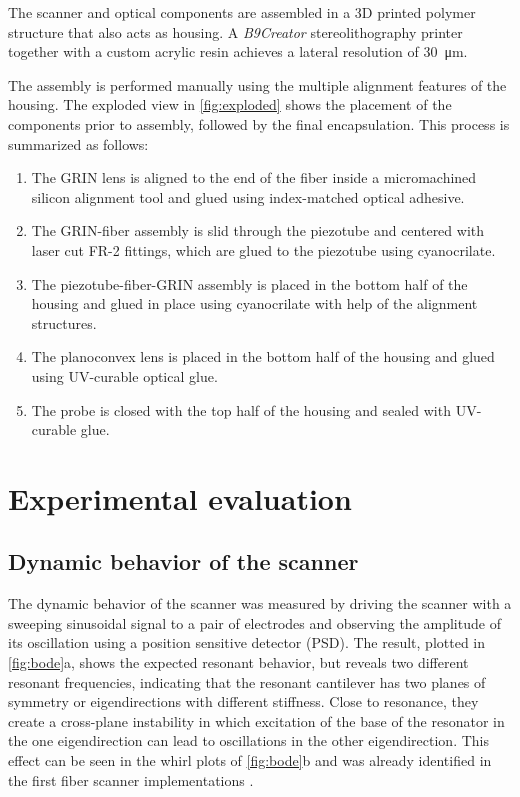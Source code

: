 \documentclass[10pt]{iopart}
\begin{document}
The scanner and optical components are assembled in a 3D printed polymer structure that also acts as housing. A \textit{B9Creator} stereolithography printer together with a custom acrylic resin achieves a lateral resolution of \SI{30}{\micro\meter}.

The assembly is performed manually using the multiple alignment features of the housing. The exploded view in \autoref{fig:exploded} shows the placement of the components prior to assembly, followed by the final encapsulation. This process is summarized as follows:

\begin{enumerate}
\item The GRIN lens is aligned to the end of the fiber inside a micromachined silicon alignment tool and glued using index-matched optical adhesive.
\item The GRIN-fiber assembly is slid through the piezotube and centered with laser cut FR-2 fittings, which are glued to the piezotube using cyanocrilate.
\item The piezotube-fiber-GRIN assembly is placed in the bottom half of the housing and glued in place using cyanocrilate with help of the alignment structures.
\item The planoconvex lens is placed in the bottom half of the housing and glued using UV-curable optical glue.
\item The probe is closed with the top half of the housing and sealed with UV-curable glue.
\end{enumerate}


\section{Experimental evaluation}

\subsection{Dynamic behavior of the scanner}
\label{sec:whirling}

The dynamic behavior of the scanner was measured by driving the scanner with a sweeping sinusoidal signal to a pair of electrodes and observing the amplitude of its oscillation using a position sensitive detector (PSD). The result, plotted in \autoref{fig:bode}a, shows the expected resonant behavior, but reveals two different resonant frequencies, indicating that the resonant cantilever has two planes of symmetry or eigendirections with different stiffness. Close to resonance, they create a cross-plane instability in which excitation of the base of the resonator in the one eigendirection can lead to oscillations in the other eigendirection. This effect can be seen in the whirl plots of \autoref{fig:bode}b and was already identified in the first fiber scanner implementations \cite{Seibel2001}.
\end{document}
